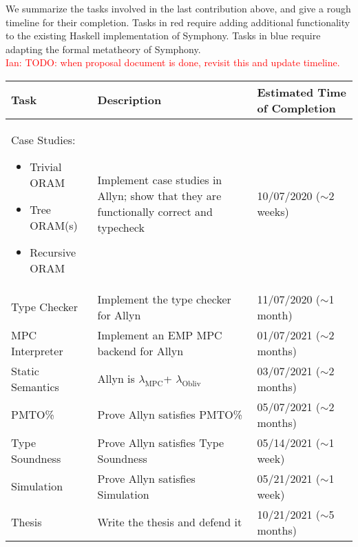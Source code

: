 \documentclass{report}
\newcommand{\lang}{Allyn\xspace}
\newcommand{\mpc}{\ensuremath{\lambda_{\mathrm{MPC}}}\xspace}
\newcommand{\obliv}{\ensuremath{\lambda_{\mathrm{Obliv}}}\xspace}
\newcommand{\ins}[1]{\textcolor{red}{Ian: #1}}
\begin{document}
We summarize the tasks involved in the last contribution above, and give a rough timeline for their completion. Tasks in
\colorbox{implColor}{red} require adding additional functionality to the existing Haskell implementation of Symphony.
Tasks in \colorbox{theoryColor}{blue} require adapting the formal metatheory of Symphony. \\

\ins{TODO: when proposal document is done, revisit this and update timeline.}

\begin{tabular}{|p{}|p{}|p{}|}
  \hline
  \textbf{Task} & \textbf{Description} & \textbf{Estimated Time of Completion} \\
  \hline
  \rowcolor{implColor}
  Case Studies:
  \begin{itemize}
  \item Trivial ORAM
  \item Tree ORAM(s)
  \item Recursive ORAM
  \end{itemize}    & Implement case studies in \lang;
  show that they are functionally correct and typecheck & 10/07/2020 ($\sim$2 weeks)  \\ \hline
  \rowcolor{implColor}
  Type Checker     & Implement the type checker for \lang                  & 11/07/2020 ($\sim$1 month)  \\ \hline
  \rowcolor{implColor}
  MPC Interpreter  & Implement an EMP MPC backend for \lang                & 01/07/2021 ($\sim$2 months) \\ \hline
  \rowcolor{theoryColor}
  Static Semantics & \lang is \mpc + \obliv                                & 03/07/2021 ($\sim$2 months) \\ \hline
  \rowcolor{theoryColor}
  PMTO\%           & Prove \lang satisfies PMTO\%                          & 05/07/2021 ($\sim$2 months) \\ \hline
  \rowcolor{theoryColor}
  Type Soundness   & Prove \lang satisfies Type Soundness                  & 05/14/2021 ($\sim$1 week)   \\ \hline
  \rowcolor{theoryColor}
  Simulation       & Prove \lang satisfies Simulation                      & 05/21/2021 ($\sim$1 week)   \\ \hline
  Thesis           & Write the thesis and defend it                        & 10/21/2021 ($\sim$5 months) \\ \hline
\end{tabular}
\end{document}
